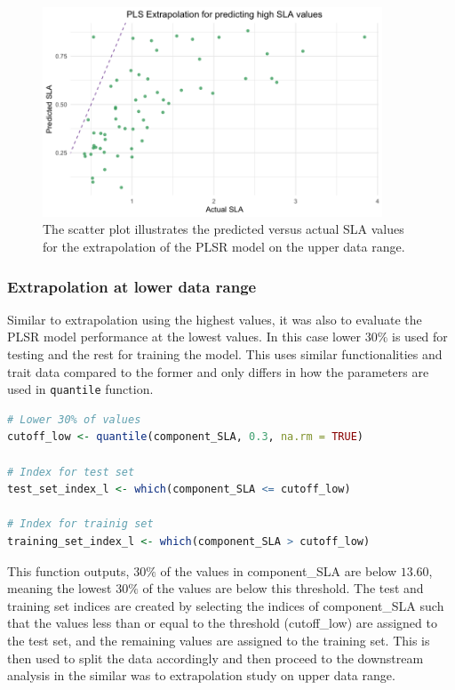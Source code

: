 \documentclass[12pt,a4paper]{report}
\begin{document}
\begin{figure}[h]
    \centering
    \includegraphics[width=0.9\textwidth]{Figures/extra_h_plsr_sla.png}
    \caption{The scatter plot illustrates the predicted versus actual SLA values for the extrapolation of the PLSR model on the upper data range.}
    \label{fig:extra_h_plsr}
\end{figure}


\subsubsection*{Extrapolation at lower data range}
Similar to extrapolation using the highest values, it was also to evaluate the PLSR model performance at the lowest values. In this case lower $30\%$ is used for testing and the rest for training the model. This uses similar functionalities and trait data compared to the former and only differs in how the parameters are used in \texttt{quantile} function. \\

\begin{lstlisting}[language=R, style=mystyle]
# Lower 30% of values
cutoff_low <- quantile(component_SLA, 0.3, na.rm = TRUE)

# Index for test set
test_set_index_l <- which(component_SLA <= cutoff_low)

# Index for trainig set
training_set_index_l <- which(component_SLA > cutoff_low)
\end{lstlisting}

This function outputs, $30\%$ of the values in component\_SLA are below $13.60$, meaning the lowest $30\%$ of the values are below this threshold. The test and training set indices are created by selecting the indices of component\_SLA such that the values less than or equal to the threshold (cutoff\_low) are assigned to the test set, and the remaining values are assigned to the training set. This is then used to split the data accordingly and then proceed to the downstream analysis in the similar was to extrapolation study on upper data range.
\end{document}
